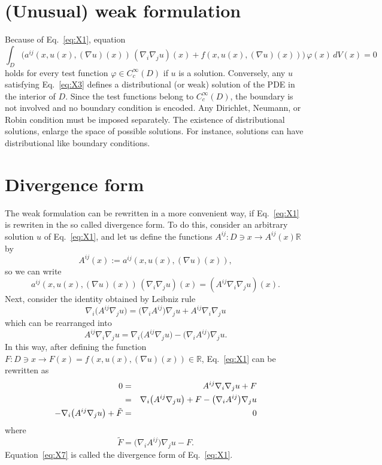 \documentclass[aps,prl,twocolumn,groupedaddress]{revtex4-2}
\newcommand{\RR}{\mathbb{R}}
\begin{document}
\section{(Unusual) weak formulation}


Because of Eq.~\ref{eq:X1}, equation
\begin{equation}
\label{eq:X3}
\int_D
\bigg(
a^{ij}(x,u(x),(\nabla u)(x))
\,
(\nabla_i \nabla_j u)(x)
+
f(x,u(x),(\nabla u)(x))
\bigg)\,
\varphi(x)\,
dV(x)
=
0
\end{equation}
holds for every test function $\varphi\in C_c^{\infty}(D)$ if $u$ is a solution.
Conversely, any $u$ satisfying Eq.~\ref{eq:X3} defines a distributional (or weak) solution of the PDE in the interior of $D$. 
Since the test functions belong to $C_c^{\infty}(D)$, the boundary is not involved and no boundary condition is encoded. 
Any Dirichlet, Neumann, or Robin condition must be imposed separately.
The existence of distributional solutions, enlarge the space of possible solutions.
For instance, solutions can have distributional like boundary conditions.

\section{Divergence form}


The weak formulation can be rewritten in a more convenient way, if Eq.~\ref{eq:X1} is rewriten in the so called divergence form.
To do this, consider an arbitrary solution $u$ of Eq.~\ref{eq:X1}, and let us define the functions $A^{ij}:D\ni x\to A^{ij}(x)\RR$ by
$$
A^{ij}(x)
:=
a^{ij}(x,u(x),(\nabla u)(x)),
$$
so we can write
$$
a^{ij}(x,u(x),(\nabla u)(x))\,
(\nabla_i \nabla_j u)
(x)
=
(A^{ij}
\nabla_i
\nabla_j
u)
(x)
.
$$
Next, consider the identity obtained by Leibniz rule
$$
\nabla_i
\big(
A^{ij}
\nabla_j
u
\big)
=
\big(
\nabla_i
A^{ij}
\big)
\nabla_j
u
+
A^{ij}
\nabla_i
\nabla_j
u
$$
which can be rearranged into
$$
A^{ij}
\nabla_i
\nabla_j
u
=
\nabla_i
\big(
A^{ij}
\nabla_j
u
\big)
-
\big(
\nabla_i
A^{ij}
\big)
\nabla_j
u
.
$$
In this way, after defining the function $F:D\ni x\to F(x)=f(x,u(x),(\nabla u)(x))\in \RR$, Eq.~\ref{eq:X1} can be rewritten as
\begin{eqnarray}
\label{eq:X7}
0
&=&
A^{ij}
\nabla_i
\nabla_j
u
+
F
\notag
\\
&=&
\nabla_i
\big(
A^{ij}
\nabla_j
u
\big)
+
F
-
\big(
\nabla_i
A^{ij}
\big)
\nabla_j
u
\notag
\\
-
\nabla_i
\big(
A^{ij}
\nabla_j
u
\big)
+
\tilde{F}
&=&
0
\end{eqnarray}
where
\begin{equation}
\label{eq:X8}
\tilde{F}
=
\big(
\nabla_i
A^{ij}
\big)
\nabla_j
u
-
F
.
\end{equation}
Equation~\ref{eq:X7} is called the divergence form of Eq.~\ref{eq:X1}.
\end{document}
